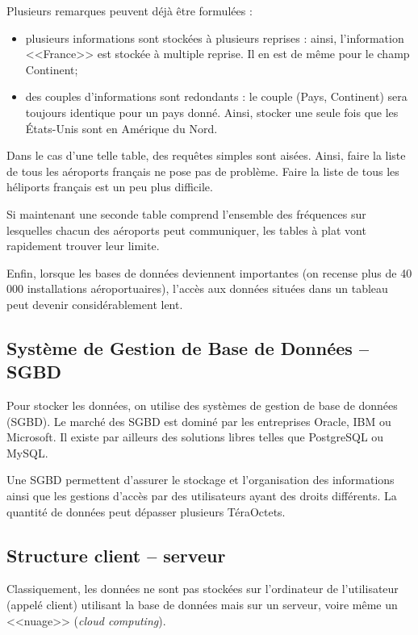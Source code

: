 \documentclass[10pt]{article}
\begin{document}
Plusieurs remarques peuvent déjà être formulées : 
\begin{itemize}
\item plusieurs informations sont stockées à plusieurs reprises : ainsi, l'information <<France>> est stockée à multiple reprise. Il en est de même pour le champ Continent;
\item des couples d'informations sont redondants : le couple (Pays, Continent) sera toujours identique pour un pays donné. Ainsi, stocker une seule fois que les États-Unis sont en Amérique du Nord.
\end{itemize}

Dans le cas d'une telle table, des requêtes simples sont aisées. Ainsi, faire la liste de tous les aéroports français ne pose pas de problème. Faire la liste de tous les héliports français est un peu plus difficile. 

Si maintenant une seconde table comprend l'ensemble des fréquences sur lesquelles chacun des aéroports peut communiquer, les tables à plat vont rapidement trouver leur limite. 

Enfin, lorsque les bases de données deviennent importantes (on recense plus de 40 000 installations aéroportuaires), l'accès aux données situées dans un tableau peut devenir considérablement lent. 

\subsection{Système de Gestion de Base de Données -- SGBD}
Pour stocker les données, on utilise des systèmes de gestion de base de données (SGBD). Le marché des SGBD est dominé par les entreprises Oracle, IBM ou Microsoft. Il existe par ailleurs des solutions libres telles que PostgreSQL ou MySQL. 

Une SGBD permettent d'assurer le stockage et l'organisation des informations ainsi que les gestions d'accès par des utilisateurs ayant des droits différents. La quantité de données peut dépasser plusieurs TéraOctets.


\subsection{Structure client -- serveur}


Classiquement, les données ne sont pas stockées sur l'ordinateur de l'utilisateur (appelé client) utilisant la base de données mais sur un serveur, voire même un <<nuage>> (\textit{cloud computing}). 
\end{document}
